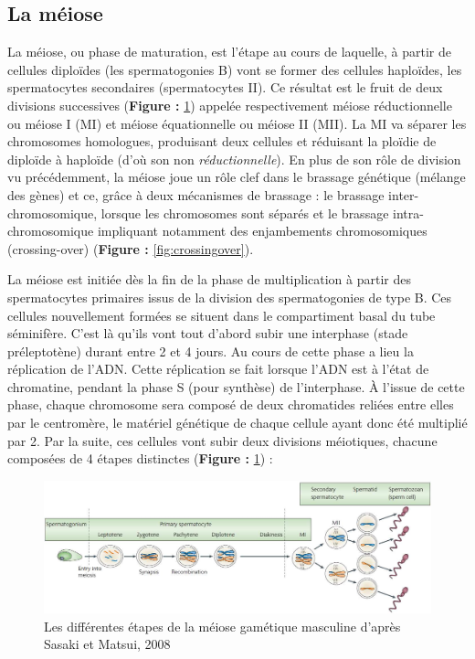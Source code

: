 \documentclass[12pt,twoside]{reedthesis}
\theoremstyle{definition}
\theoremstyle{definition}
\theoremstyle{remark}
\begin{document}
  \newpage 
  
  \hypertarget{meiose}{\subsection{La méiose}\label{meiose}}
  
  La méiose, ou phase de maturation, est l'étape au cours de laquelle, à
  partir de cellules diploïdes (les spermatogonies B) vont se former des
  cellules haploïdes, les spermatocytes secondaires (spermatocytes II). Ce
  résultat est le fruit de deux divisions successives (\textbf{Figure :
  }\ref{fig:meiose}) appelée respectivement méiose réductionnelle ou
  méiose I (MI) et méiose équationnelle ou méiose II (MII). La MI va
  séparer les chromosomes homologues, produisant deux cellules et
  réduisant la ploïdie de diploïde à haploïde (d'où son non
  \emph{réductionnelle}). En plus de son rôle de division vu précédemment,
  la méiose joue un rôle clef dans le brassage génétique (mélange des
  gènes) et ce, grâce à deux mécanismes de brassage : le brassage
  inter-chromosomique, lorsque les chromosomes sont séparés et le brassage
  intra-chromosomique impliquant notamment des enjambements chromosomiques
  (crossing-over) (\textbf{Figure : }\ref{fig:crossingover}).
  
  La méiose est initiée dès la fin de la phase de multiplication à partir
  des spermatocytes primaires issus de la division des spermatogonies de
  type B. Ces cellules nouvellement formées se situent dans le
  compartiment basal du tube séminifère. C'est là qu'ils vont tout d'abord
  subir une interphase (stade préleptotène) durant entre 2 et 4 jours. Au
  cours de cette phase a lieu la réplication de l'ADN. Cette réplication
  se fait lorsque l'ADN est à l'état de chromatine, pendant la phase S
  (pour synthèse) de l'interphase. À l'issue de cette phase, chaque
  chromosome sera composé de deux chromatides reliées entre elles par le
  centromère, le matériel génétique de chaque cellule ayant donc été
  multiplié par 2. Par la suite, ces cellules vont subir deux divisions
  méiotiques, chacune composées de 4 étapes distinctes (\textbf{Figure :
  }\ref{fig:meiose}) :
  
  \begin{figure}
  
  {\centering \includegraphics[scale=0.33]{figure/Meiosis_Stages} 
  
  }
  
  \caption[Les différentes étapes de la méiose gamétique masculine]{Les différentes étapes de la méiose gamétique masculine d'après Sasaki et Matsui, 2008}\label{fig:meiose}
  \end{figure}
  
\end{document}
